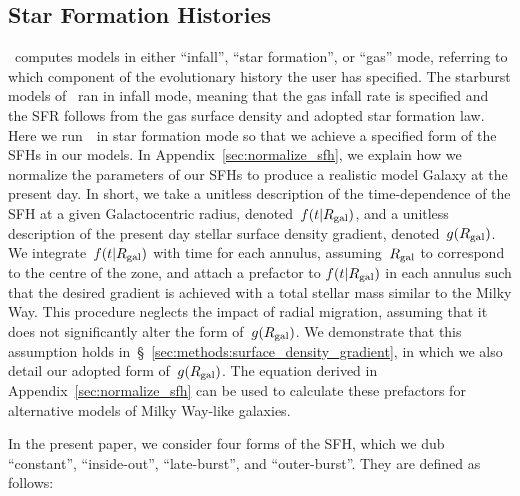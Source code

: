 \documentclass[draft2.tex]{subfiles}
\begin{document}
\subsection{Star Formation Histories} 
\label{sec:methods:sfhs} 
\vice~computes models in either ``infall'', ``star formation'', or ``gas'' 
mode, referring to which component of the evolutionary history the user has 
specified. 
The starburst models of~\citet{Johnson2020} ran in infall mode, 
meaning that the gas infall rate is specified and the SFR follows from the gas 
surface density and adopted star formation law. 
Here we run~\vice~in star formation mode so that we achieve a specified form of 
the SFHs in our models. 
In Appendix~\ref{sec:normalize_sfh}, we explain how we normalize the parameters 
of our SFHs to produce a realistic model Galaxy at the present day. 
In short, we take a unitless description of the time-dependence of the SFH at a 
given Galactocentric radius, denoted~$f(t|R_\text{gal})$, and a unitless description 
of the present day stellar surface density gradient, denoted~$g(R_\text{gal})$. 
We integrate~$f(t|R_\text{gal})$ with time for each annulus, assuming~$R_\text{gal}$ to 
correspond to the centre of the zone, and attach a prefactor to 
$f(t|R_\text{gal})$ in each annulus such that the desired gradient is achieved 
with a total stellar mass similar to the Milky Way. 
This procedure neglects the impact of radial migration, assuming that it does 
not significantly alter the form of~$g(R_\text{gal})$. 
We demonstrate that this assumption holds 
in~\S~\ref{sec:methods:surface_density_gradient}, in which we also detail our 
adopted form of~$g(R_\text{gal})$. 
The equation derived in Appendix~\ref{sec:normalize_sfh} can be used to 
calculate these prefactors for alternative models of Milky Way-like galaxies. 
\par 
In the present paper, we consider four forms of the SFH, which we dub 
``constant'', ``inside-out'', ``late-burst'', and ``outer-burst''. 
They are defined as follows: 
\end{document}
